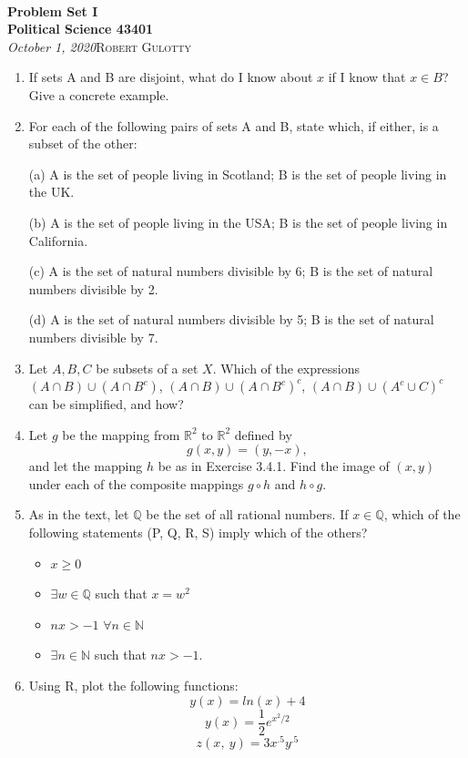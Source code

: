 \documentclass[12pt]{article}
\begin{document}
{\noindent\Huge\bf  \\[0.5\baselineskip] {\selectfont  Problem Set I}         }\\[2\baselineskip] %
{ {\bf {}\selectfont Political Science 43401}\\ {\textit{\selectfont     October 1, 2020}}}\hfill   {\large \textsc{Robert Gulotty}} %
\\[1.4\baselineskip] 





\begin{enumerate}

\item If sets A and B are disjoint, what do I know about $x$ if I know that $x\in B$?  Give a concrete example.


\item[3.1.1]  For each of the following pairs of sets A and B, state which, if either, is a subset of the other:

(a) A is the set of people living in Scotland; B is the set of people living in the UK.

(b) A is the set of people living in the USA; B is the set of people living in California.

(c) A is the set of natural numbers divisible by 6; B is the set of natural numbers divisible by 2.

(d) A is the set of natural numbers divisible by 5; B is the set of natural numbers divisible by 7.


\item[3.1.3] Let $A, B, C$ be subsets of a set $X$.  Which of the expressions $(A\cap B)\cup (A\cap B^c)$, $(A\cap B)\cup (A\cap B^c)^c$, $(A\cap B)\cup (A^c\cup C)^c$ can be simplified, and how?


\item[3.4.2] Let $g$ be the mapping from $\mathbb{R}^2$ to $\mathbb{R}^2$ defined by $$g(x, y)=(y, -x),$$ and let the mapping $h$ be as in Exercise 3.4.1.  Find the image of $(x, y)$ under each of the composite mappings $g\circ h$ and $h\circ g$.


\item[31.1.1] As in the text, let $\mathbb{Q}$ be the set of all rational numbers. If $x\in \mathbb{Q}$, which of the following statements (P, Q, R, S) imply which of the others?

\begin{itemize}

\item[P:] $x\geq 0$
\item[Q:] $\exists w\in \mathbb{Q} $ such that $x=w^2$
\item[R:] $nx>-1$ $\forall n\in \mathbb{N}$
\item[S:] $\exists n\in \mathbb{N}$ such that $nx>-1$.

\end{itemize}
\item[R Bonus] Using R, plot the following functions:
$$y(x)=ln(x)+4 $$
$$y(x)=\frac{1}{2}e^{x^2/2}$$
$$z(x,\ y)=3x^{.5}y^{.5}$$

\end{enumerate}
\end{document}

